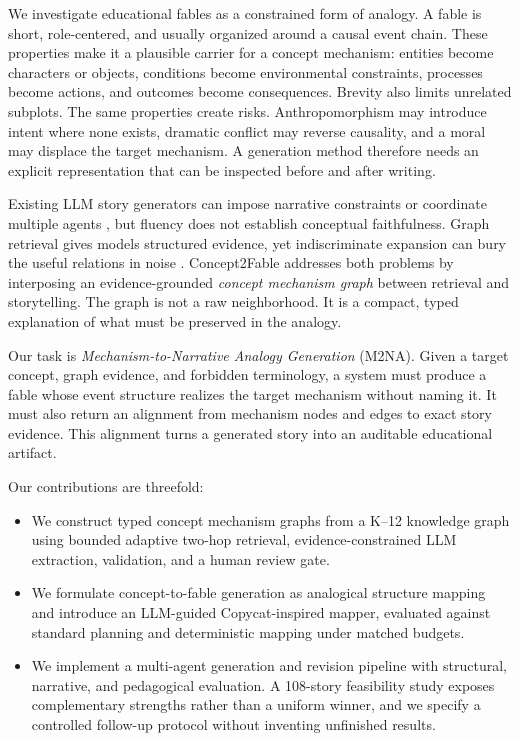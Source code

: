 \documentclass[letterpaper]{article} %
\begin{document}
We investigate educational fables as a constrained form of analogy. A fable is short, role-centered, and usually organized around a causal event chain. These properties make it a plausible carrier for a concept mechanism: entities become characters or objects, conditions become environmental constraints, processes become actions, and outcomes become consequences. Brevity also limits unrelated subplots. The same properties create risks. Anthropomorphism may introduce intent where none exists, dramatic conflict may reverse causality, and a moral may displace the target mechanism. A generation method therefore needs an explicit representation that can be inspected before and after writing.

Existing LLM story generators can impose narrative constraints or coordinate multiple agents \citep{yang2022re3,feng2025ssgen,chen2026storybox}, but fluency does not establish conceptual faithfulness. Graph retrieval gives models structured evidence, yet indiscriminate expansion can bury the useful relations in noise \citep{edge2024graphrag,xu2025amar}. Concept2Fable addresses both problems by interposing an evidence-grounded \emph{concept mechanism graph} between retrieval and storytelling. The graph is not a raw neighborhood. It is a compact, typed explanation of what must be preserved in the analogy.

Our task is \emph{Mechanism-to-Narrative Analogy Generation} (M2NA). Given a target concept, graph evidence, and forbidden terminology, a system must produce a fable whose event structure realizes the target mechanism without naming it. It must also return an alignment from mechanism nodes and edges to exact story evidence. This alignment turns a generated story into an auditable educational artifact.

Our contributions are threefold:
\begin{itemize}
    \item We construct typed concept mechanism graphs from a K--12 knowledge graph using bounded adaptive two-hop retrieval, evidence-constrained LLM extraction, validation, and a human review gate.
    \item We formulate concept-to-fable generation as analogical structure mapping and introduce an LLM-guided Copycat-inspired mapper, evaluated against standard planning and deterministic mapping under matched budgets.
    \item We implement a multi-agent generation and revision pipeline with structural, narrative, and pedagogical evaluation. A 108-story feasibility study exposes complementary strengths rather than a uniform winner, and we specify a controlled follow-up protocol without inventing unfinished results.
\end{itemize}
\end{document}
